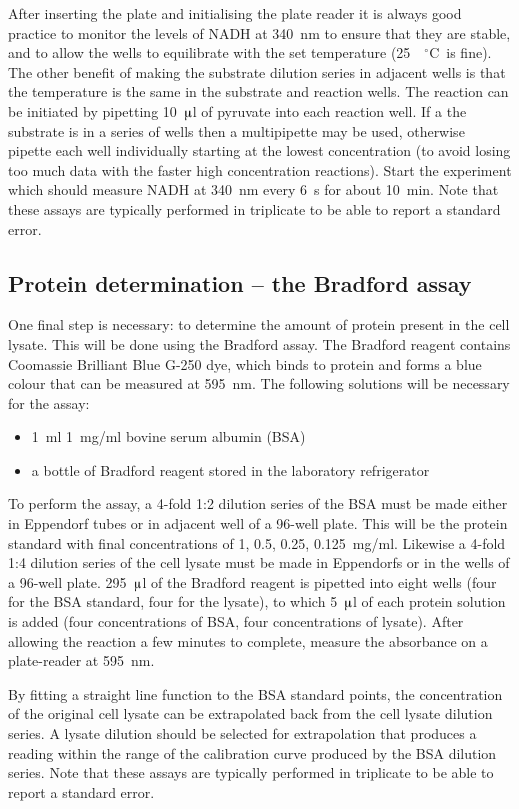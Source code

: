 \documentclass[a4paper]{article}
\newcommand{\dc}{~$^{\circ}$C}
\newcommand{\micro}{$\muup$}
\begin{document}
\begin{multicols}{2}
After inserting the plate and initialising the plate reader it is always good
practice to monitor the levels of NADH at 340~nm to ensure that they are
stable, and to allow the wells to equilibrate with the set temperature (25~\dc\
is fine). The other benefit of making the substrate dilution series in adjacent
wells is that the temperature is the same in the substrate and reaction wells.
The reaction can be initiated by pipetting 10~\micro l of pyruvate into each
reaction well. If a the substrate is in a series of wells then a multipipette
may be used, otherwise pipette each well individually starting at the lowest
concentration (to avoid losing too much data with the faster high concentration
reactions). Start the experiment which should measure NADH at 340~nm every 6~s
for about 10~min. Note that these assays are typically performed in triplicate
to be able to report a standard error.



\subsection{Protein determination -- the Bradford assay}

One final step is necessary: to determine the amount of protein present in the
cell lysate. This will be done using the Bradford assay. The Bradford reagent
contains Coomassie Brilliant Blue G-250 dye, which binds to protein and forms a
blue colour that can be measured at 595~nm. The following solutions will be
necessary for the assay:

\begin{itemize}
\item 1~ml 1~mg/ml bovine serum albumin (BSA)
\item a bottle of Bradford reagent stored in the laboratory refrigerator 
\end{itemize}

To perform the assay, a 4-fold 1:2 dilution series of the BSA must be made
either in Eppendorf tubes or in adjacent well of a 96-well plate. This will be
the protein standard with final concentrations of 1, 0.5, 0.25, 0.125~mg/ml.
Likewise a 4-fold 1:4 dilution series of the cell lysate must be made in
Eppendorfs or in the wells of a 96-well plate. 295~\micro l of the Bradford
reagent is pipetted into eight wells (four for the BSA standard, four for the
lysate), to which 5~\micro l of each protein solution is added (four
concentrations of BSA, four concentrations of lysate). After allowing the
reaction a few minutes to complete, measure the absorbance on a plate-reader at
595~nm.

By fitting a straight line function to the BSA standard points, the
concentration of the original cell lysate can be extrapolated back from the
cell lysate dilution series. A lysate dilution should be selected for
extrapolation that produces a reading within the range of the calibration curve
produced by the BSA dilution series. Note that these assays are typically
performed in triplicate to be able to report a standard error.


\end{multicols} 
\end{document}

